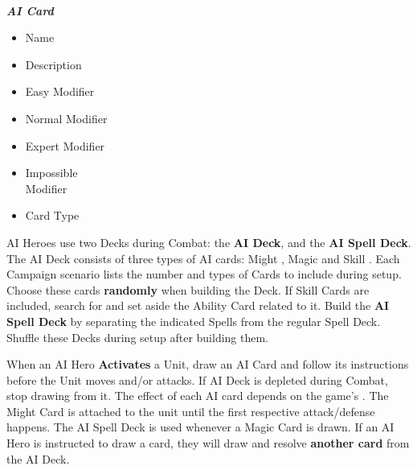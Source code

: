 \begin{multicols}{2}
\begin{multicols*}{2}
  \begin{center}
    \vspace*{-1.5em}
    \\
    \phantom{\ldots\ldots}\footnotesize{\textbf{\textit{\textcolor{darkcandyapplered}{AI Card}}}}
    \vspace*{-1em}
  \end{center}
  \vspace*{\fill}
  \columnbreak
  \scriptsize
  \begin{itemize}[itemsep=0pt]
    \item[\textbf{1.}] Name
    \item[\textbf{2.}] Description
    \item[\textbf{3.}] Easy Modifier
    \item[\textbf{4.}] Normal Modifier
    \item[\textbf{5.}] Expert Modifier
    \item[\textbf{6.}] Impossible\\Modifier
    \item[\textbf{7.}] Card Type
  \end{itemize}\vspace*{\fill}
\end{multicols*}

AI Heroes use two Decks during Combat: the \textbf{AI Deck}, and the \textbf{AI Spell Deck}.
The AI Deck consists of three types of AI cards: Might , Magic  and Skill .
Each Campaign scenario lists the number and types of Cards to include during setup.
Choose these cards \textbf{randomly} when building the Deck.
If Skill Cards are included, search for and set aside the Ability Card related to it.
Build the \textbf{AI Spell Deck} by separating the indicated Spells from the regular Spell Deck.
Shuffle these Decks during setup after building them.

When an AI Hero \textbf{Activates} a Unit, draw an AI Card and follow its instructions before the Unit moves and/or attacks.
If AI Deck is depleted during Combat, stop drawing from it.
The effect of each AI card depends on the game's .
The Might Card  is attached to the unit until the first respective attack/defense happens.
The AI Spell Deck is used whenever a Magic Card  is drawn.
If an AI Hero is instructed to draw a card, they will draw and resolve \textbf{another card} from the AI Deck.


\end{multicols}
